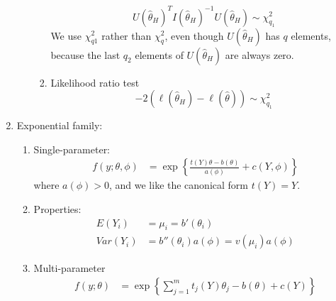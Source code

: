 \documentclass{amsart}
\begin{document}
\begin{enumerate}
\begin{enumerate}
\begin{enumerate}
\begin{equation*}
        U(\hat{\theta}_H)^T I(\hat{\theta}_H)^{-1} U(\hat{\theta}_H)
        \sim \chi^2_{q_1}
      \end{equation*}
      We use $\chi^2_{q1}$ rather than $\chi^2_q$, even though
      $U(\hat{\theta}_H)$ has $q$ elements, because the last $q_2$
      elements of $U(\hat{\theta}_H)$ are always zero.
    \item Likelihood ratio test
      \begin{equation*}
        -2(\ell(\hat{\theta}_H) - \ell(\hat{\theta})) \sim \chi^2_{q_1}
      \end{equation*}
    \end{enumerate}
  \end{enumerate}
\item Exponential family:
  \begin{enumerate}
  \item Single-parameter:
    \begin{align*}
      f(y; \theta, \phi) & = \exp\left\{\frac{t(Y)\theta - b(\theta)}{a(\phi)} + c(Y, \phi)\right\} 
    \end{align*}
    where $a(\phi) > 0$, and we like the canonical form $t(Y) = Y$.
  \item Properties:
    \begin{align*}
      E(Y_i) & = \mu_i = b'(\theta_i) \\
      Var(Y_i) & = b''(\theta_i) a(\phi) = v(\mu_i) a(\phi) 
    \end{align*}
  \item Multi-parameter
    \begin{align*}
      f(y; \theta) & = \exp\left\{\sum_{j=1}^m t_j(Y)\theta_j - b(\theta) + c(Y)\right\} 
    \end{align*}


\end{enumerate}
\end{enumerate}
\end{document}
